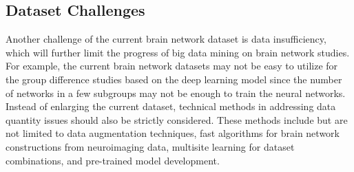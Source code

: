 \subsection{ Dataset Challenges}
Another challenge of the current brain network
dataset is data insufficiency, which will further 
limit the progress of big data mining on brain network studies. 
For example, the current brain network datasets may not be easy 
to utilize for the group difference studies based on the deep 
learning model since the number of networks in a few subgroups 
may not be enough to train the neural networks.
Instead of enlarging the current dataset, technical methods 
in addressing data quantity issues should also be strictly 
considered. These methods include but are not limited to 
data augmentation techniques, fast algorithms for brain 
network constructions from neuroimaging data, multisite 
learning for dataset combinations, and pre-trained model
development. \cite{Tang2023}


